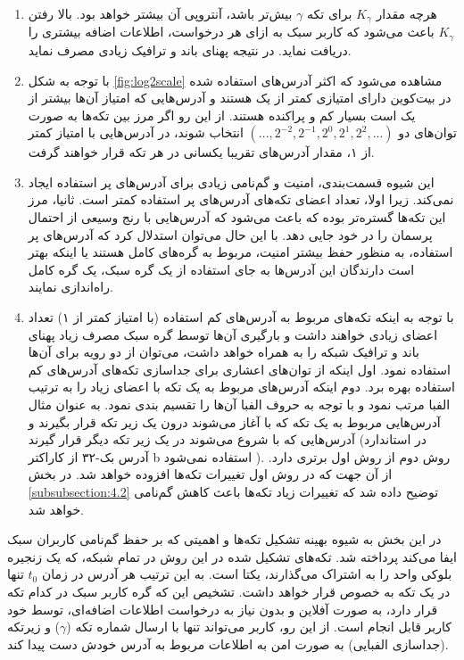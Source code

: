 \begin{enumerate}
	\item{%
		هرچه مقدار $K_\gamma$ برای تکه $\gamma$ بیش‌تر باشد، آنتروپی آن بیشتر خواهد بود. بالا رفتن $K_\gamma$ باعث می‌شود که کاربر سبک به ازای هر درخواست، اطلاعات اضافه بیشتری را دریافت نماید. در نتیجه پهنای باند و ترافیک زیادی مصرف نماید. 	
	}
	\item{%
		با توجه به شکل \ref{fig:log2scale} مشاهده می‌شود که اکثر آدرس‌های استفاده شده در بیت‌کوین دارای امتیازی کمتر از یک هستند و آدرس‌هایی که امتیاز آن‌ها بیشتر از یک است بسیار کم و پراکنده هستند. از این رو اگر مرز بین تکه‌‌ها به صورت توان‌های دو
		$(..., 2^{-2}, 2^{-1}, 2^{0}, 2^{1}, 2^{2},...)$
		انتخاب شوند، در آدرس‌هایی با امتیاز کمتر از ۱، مقدار آدرس‌های تقریبا یکسانی در هر تکه قرار خواهند گرفت.
	}
	\item{%
		این شیوه قسمت‌بندی، امنیت و گم‌نامی زیادی برای آدرس‌های پر استفاده ایجاد نمی‌کند. زیرا اولا، تعداد اعضای تکه‌های آدرس‌های پر استفاده کمتر است. ثانیا، مرز این تکه‌ها گستره‌تر بوده که باعث می‌شود که آدرس‌هایی با رنج وسیعی از احتمال پرسمان را در خود جایی دهد. با این حال می‌توان استدلال کرد که آدرس‌های پر استفاده، به منظور حفظ بیشتر امنیت، مربوط به گره‌های کامل هستند یا اینکه بهتر است دارندگان این آدرس‌ها به جای استفاده از یک گره سبک،  یک گره کامل راه‌اندازی نمایند. 
	}
	\item{%
		با توجه به اینکه تکه‌های مربوط به آدرس‌های کم استفاده (با امتیاز کمتر از ۱) تعداد اعضای زیادی خواهند داشت و بارگیری آن‌ها توسط گره سبک مصرف زیاد پهنای باند و ترافیک شبکه را به همراه خواهد داشت، می‌توان از دو رویه برای آن‌ها استفاده نمود. اول اینکه از توان‌های اعشاری برای جداسازی تکه‌های آدرس‌های کم‌ استفاده بهره برد. دوم اینکه آدرس‌های مربوط به یک تکه با اعضای زیاد را به ترتیب الفبا مرتب نمود و با توجه به حروف الفبا آن‌ها را تقسیم بندی نمود. به عنوان مثال آدرس‌هایی مربوط به یک تکه که با
		آغاز می‌شوند درون یک زیر تکه قرار بگیرند و آدرس‌هایی که با  شروع می‌شوند در یک زیر تکه دیگر قرار گیرند (در استاندارد آدرس بک-۳۲  از کاراکتر b استفاده نمی‌شود \cite{Wuille2017}). روش دوم از روش اول برتری دارد. از آن جهت که در روش اول تغییرات تکه‌ها افزوده خواهد شد. در بخش \ref{subsubsection:4.2} توضیح داده شد که تغییرات زیاد تکه‌ها باعث کاهش گم‌نامی خواهد شد.
	}
	
\end{enumerate}
در این بخش به شیوه بهینه تشکیل تکه‌ها و اهمیتی که بر حفظ گم‌نامی کاربران سبک ایفا می‌کند پرداخته شد. تکه‌های تشکیل شده در این روش در تمام شبکه، که یک زنجیره بلوکی واحد را به اشتراک می‌گذارند، یکتا است. به این ترتیب هر آدرس  در زمان $t_0$ تنها در یک تکه به خصوص قرار خواهد داشت. تشخیص این که گره کاربر سبک در کدام تکه قرار دارد، به صورت آفلاین و بدون نیاز به درخواست اطلاعات اضافه‌ای، توسط خود کاربر قابل انجام است. از این رو،‌ کاربر می‌تواند تنها با ارسال شماره تکه ($\gamma$) و زیرتکه (جداسازی الفبایی) به صورت امن به اطلاعات مربوط به آدرس خودش دست پیدا کند.


